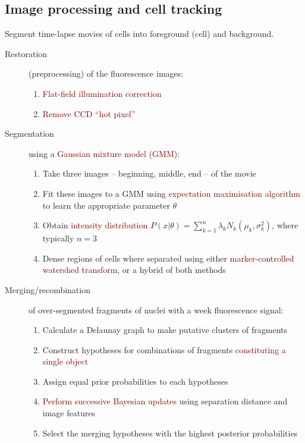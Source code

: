 \documentclass[a4paper,11pt]{article}
\begin{document}
\subsection{Image processing and cell tracking}
Segment time-lapse movies of cells into foreground (cell) and background.
\begin{description}
    \item[Restoration] (preprocessing) of the fluorescence images:
    \begin{enumerate}
        \item \textcolor{Maroon}{Flat-field illumination correction}
        \item \textcolor{Maroon}{Remove CCD ``hot pixel''}
    \end{enumerate}
    
    \item[Segmentation] using a \textcolor{Maroon}{Gaussian mixture model (GMM)}:
    \begin{enumerate}
        \item Take three images -- beginning, middle, end -- of the movie
        \item Fit these images to a GMM using \textcolor{Maroon}{expectation maximisation algorithm} \cite{xu1996convergence} to learn the appropriate parameter $\theta$
        \item Obtain \textcolor{Maroon}{intensity distribution} $P(x|\theta) = \sum^n_{k = 1}\lambda_k N_k (\mu_k, \sigma_k^2)$, where typically $n = 3$
        \item Dense regions of cells where separated using either \textcolor{Maroon}{marker-controlled watershed transform}, or a hybrid of both methods
    \end{enumerate}
    
    \item[Merging/recombination] of over-segmented fragments of nuclei with a week fluorescence signal:
    \begin{enumerate}
        \item Calculate a Delaunay graph to make putative clusters of fragments
        \item Construct hypotheses for combinations of fragments \textcolor{Maroon}{constituting a single object}
        \item Assign equal prior probabilities to each hypotheses
        \item \textcolor{Maroon}{Perform successive Bayesian updates} using separation distance and image features
        \item Select the merging hypotheses with the highest posterior probabilities
    \end{enumerate}
    

\end{description}
\end{document}
